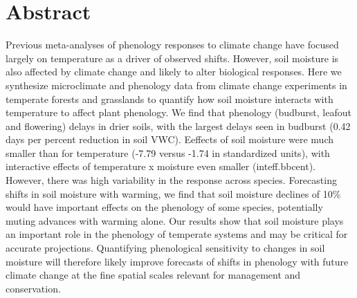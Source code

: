 \documentclass{article}
\begin{document}








\linenumbers

\section*{Abstract} %
Previous meta-analyses of phenology responses to climate change have focused largely on temperature as a driver of observed shifts. However, soil moisture is also affected by climate change and likely to alter biological responses. Here we synthesize microclimate and phenology data from climate change experiments in temperate forests and grasslands to quantify how soil moisture interacts with temperature to affect plant phenology. 
We find that phenology (budburst, leafout and flowering) delays in drier soils, with the largest delays seen in budburst (0.42 days per percent reduction in soil VWC). Eeffects of soil moisture were much smaller than for temperature (-7.79 versus -1.74 in standardized units), with interactive effects of temperature x moisture even smaller (inteff.bbcent). However, there was high variability in the response across species. Forecasting shifts in soil moisture with warming, we find that soil moisture declines of 10\% would have important effects on the phenology of some species, potentially muting advances with warming alone. Our results show that soil moisture plays an important role in the phenology of temperate systems and may be critical for accurate projections. Quantifying phenological sensitivity to changes in soil moisture will therefore likely improve forecasts of shifts in phenology with future climate change at the fine spatial scales relevant for management and conservation.


\newpage
\end{document}
